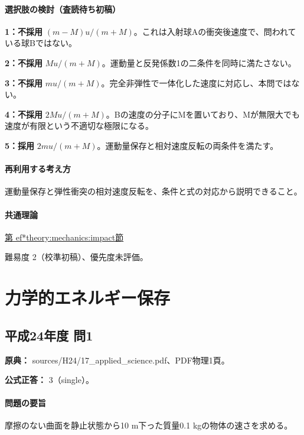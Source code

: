 \paragraph{選択肢の検討（査読待ち初稿）}

\noindent\textbf{1：不採用} \((m-M)u/(m+M)\)。これは入射球Aの衝突後速度で、問われている球Bではない。\par

\noindent\textbf{2：不採用} \(Mu/(m+M)\)。運動量と反発係数1の二条件を同時に満たさない。\par

\noindent\textbf{3：不採用} \(mu/(m+M)\)。完全非弾性で一体化した速度に対応し、本問ではない。\par

\noindent\textbf{4：不採用} \(2Mu/(m+M)\)。Bの速度の分子にMを置いており、Mが無限大でも速度が有限という不適切な極限になる。\par

\noindent\textbf{5：採用} \(2mu/(m+M)\)。運動量保存と相対速度反転の両条件を満たす。\par

\paragraph{再利用する考え方} 運動量保存と弾性衝突の相対速度反転を、条件と式の対応から説明できること。

\paragraph{共通理論} \hyperref[theory:mechanics:impact]{第
ef*{theory:mechanics:impact}節}

\par 難易度 2（校準初稿）、優先度未評価。

\section{力学的エネルギー保存}

\subsection{平成24年度 問1}
\label{q:h24-reg-applied-01}

\noindent\textbf{原典：} sources/H24/17\_applied\_science.pdf、PDF物理1頁。

\textbf{公式正答：} 3（single）。

\paragraph{問題の要旨} 摩擦のない曲面を静止状態から10 m下った質量0.1 kgの物体の速さを求める。

